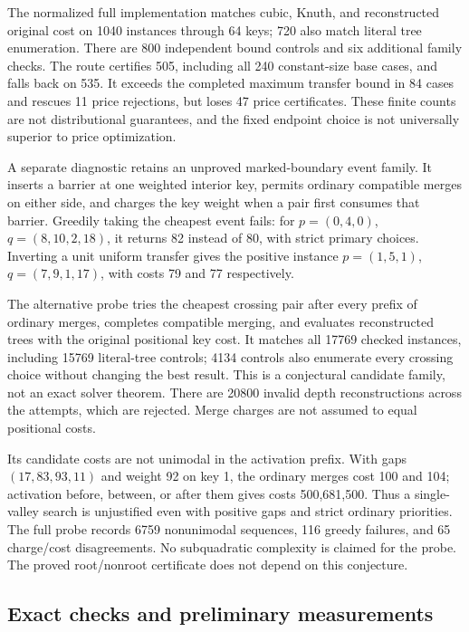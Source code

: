 \documentclass[11pt]{article}
\begin{document}
The normalized full implementation matches cubic, Knuth, and reconstructed
original cost on 1040 instances through 64 keys; 720 also match literal tree
enumeration. There are 800 independent bound controls and six additional
family checks. The route certifies 505, including all 240 constant-size base
cases, and falls back on 535. It exceeds the completed maximum transfer bound
in 84 cases and rescues 11 price rejections, but loses 47 price certificates.
These finite counts are not distributional guarantees, and the fixed endpoint
choice is not universally superior to price optimization.



A separate diagnostic retains an unproved marked-boundary event family.
It inserts a barrier at one weighted interior key, permits ordinary
compatible merges on either side, and charges the key weight when a pair
first consumes that barrier. Greedily taking the cheapest event fails:
for $p=(0,4,0)$, $q=(8,10,2,18)$, it returns 82 instead of 80, with strict
primary choices. Inverting a unit uniform transfer gives the positive
instance $p=(1,5,1)$, $q=(7,9,1,17)$, with costs 79 and 77 respectively.

The alternative probe tries the cheapest crossing pair after every prefix
of ordinary merges, completes compatible merging, and evaluates reconstructed
trees with the original positional key cost. It matches all 17769 checked
instances, including 15769 literal-tree controls; 4134 controls also enumerate
every crossing choice without changing the best result. This is a conjectural
candidate family, not an exact solver theorem. There are 20800 invalid depth
reconstructions across the attempts, which are rejected. Merge charges are
not assumed to equal positional costs.

Its candidate costs are not unimodal in the activation prefix. With gaps
$(17,83,93,11)$ and weight 92 on key 1, the ordinary merges cost 100 and 104;
activation before, between, or after them gives costs 500,681,500. Thus a
single-valley search is unjustified even with positive gaps and strict
ordinary priorities. The full probe records 6759 nonunimodal sequences,
116 greedy failures, and 65 charge/cost disagreements. No subquadratic
complexity is claimed for the probe. The proved root/nonroot certificate
does not depend on this conjecture.


\subsection{Exact checks and preliminary measurements}
\label{sec:legacy-14}
\end{document}
